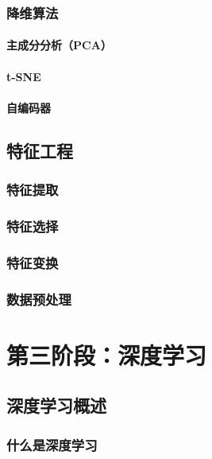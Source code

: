 \documentclass[12pt,UTF8]{ctexbook}
\begin{document}
\section{降维算法}

\subsection{主成分分析（PCA）}

\subsection{t-SNE}

\subsection{自编码器}

\chapter{特征工程}
\label{chap:feature_engineering}

\section{特征提取}

\section{特征选择}

\section{特征变换}

\section{数据预处理}

\part{第三阶段：深度学习}

\chapter{深度学习概述}
\label{chap:dl_overview}

\section{什么是深度学习}
\end{document}
